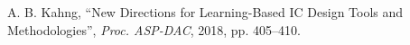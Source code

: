 A. B. Kahng,
``New Directions for Learning-Based IC Design Tools and Methodologies'',
{\em Proc. ASP-DAC}, 2018, pp. 405--410.

